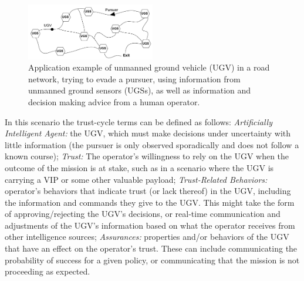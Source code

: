 	\begin{figure}[t]%
    	\centering
     	\includegraphics[width=0.5\textwidth]{Figures/RoadNet}
    	\caption{Application example of unmanned ground vehicle (UGV) in a road network, trying to evade a pursuer, using information from unmanned ground sensors (UGSs), as well as information and decision making advice from a human operator.} %
        \label{fig:RoadNet}
    \end{figure}


    In this scenario the trust-cycle terms can be defined as follows: \textit{Artificially Intelligent Agent:} the UGV, which must make decisions under uncertainty with little information (the pursuer is only observed sporadically and does not follow a known course); \textit{Trust:} The operator's willingness to rely on the UGV when the outcome of the mission is at stake, such as in a scenario where the UGV is carrying a VIP or some other valuable payload; \textit{Trust-Related Behaviors:} operator's behaviors that indicate trust (or lack thereof) in the UGV, including the information and commands they give to the UGV. This might take the form of approving/rejecting the UGV's decisions, or real-time communication and adjustments of the UGV's information based on what the operator receives from other intelligence sources; \textit{Assurances:} properties and/or behaviors of the UGV that have an effect on the operator's trust. These can include communicating the probability of success for a given policy, or communicating that the mission is not proceeding as expected.

    
    
